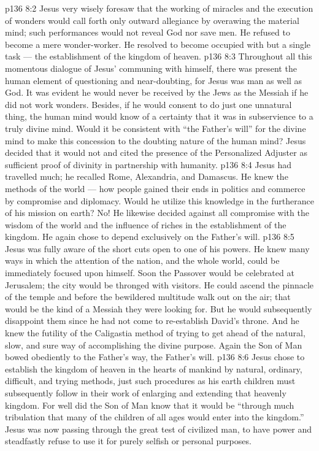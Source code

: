 \vs p136 8:2 Jesus very wisely foresaw that the working of miracles and the execution of wonders would call forth only outward allegiance by overawing the material mind; such performances would not reveal God nor save men. He refused to become a mere wonder\hyp{}worker. He resolved to become occupied with but a single task --- the establishment of the kingdom of heaven.
\vs p136 8:3 \pc Throughout all this momentous dialogue of Jesus’ communing with himself, there was present the human element of questioning and near\hyp{}doubting, for Jesus was man as well as God. It was evident he would never be received by the Jews as the Messiah if he did not work wonders. Besides, if he would consent to do just one unnatural thing, the human mind would know of a certainty that it was in subservience to a truly divine mind. Would it be consistent with “the Father’s will” for the divine mind to make this concession to the doubting nature of the human mind? Jesus decided that it would not and cited the presence of the Personalized Adjuster as sufficient proof of divinity in partnership with humanity.
\vs p136 8:4 \pc Jesus had travelled much; he recalled Rome, Alexandria, and Damascus. He knew the methods of the world --- how people gained their ends in politics and commerce by compromise and diplomacy. Would he utilize this knowledge in the furtherance of his mission on earth? No! He likewise decided against all compromise with the wisdom of the world and the influence of riches in the establishment of the kingdom. He again chose to depend exclusively on the Father’s will.
\vs p136 8:5 Jesus was fully aware of the short cuts open to one of his powers. He knew many ways in which the attention of the nation, and the whole world, could be immediately focused upon himself. Soon the Passover would be celebrated at Jerusalem; the city would be thronged with visitors. He could ascend the pinnacle of the temple and before the bewildered multitude walk out on the air; that would be the kind of a Messiah they were looking for. But he would subsequently disappoint them since he had not come to re\hyp{}establish David’s throne. And he knew the futility of the Caligastia method of trying to get ahead of the natural, slow, and sure way of accomplishing the divine purpose. Again the Son of Man bowed obediently to the Father’s way, the Father’s will.
\vs p136 8:6 Jesus chose to establish the kingdom of heaven in the hearts of mankind by natural, ordinary, difficult, and trying methods, just such procedures as his earth children must subsequently follow in their work of enlarging and extending that heavenly kingdom. For well did the Son of Man know that it would be “through much tribulation that many of the children of all ages would enter into the kingdom.” Jesus was now passing through the great test of civilized man, to have power and steadfastly refuse to use it for purely selfish or personal purposes.
